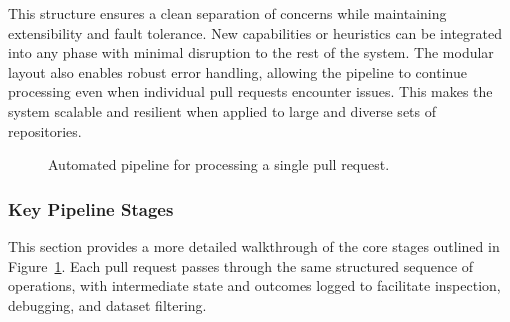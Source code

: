 This structure ensures a clean separation of concerns while maintaining extensibility and fault
tolerance. New capabilities or heuristics can be integrated into any phase with minimal disruption
to the rest of the system. The modular layout also enables robust error handling, allowing the
pipeline to continue processing even when individual pull requests encounter issues. This makes the
system scalable and resilient when applied to large and diverse sets of repositories.

\begin{figure}[!htbp]
	\centering
	\caption{Automated pipeline for processing a single pull request.}
	\label{fig:pipeline}
\end{figure}

\subsubsection{Key Pipeline Stages}

This section provides a more detailed walkthrough of the core stages outlined in
Figure~\ref{fig:pipeline}. Each pull request passes through the same structured sequence of
operations, with intermediate state and outcomes logged to facilitate inspection, debugging, and
dataset filtering.


